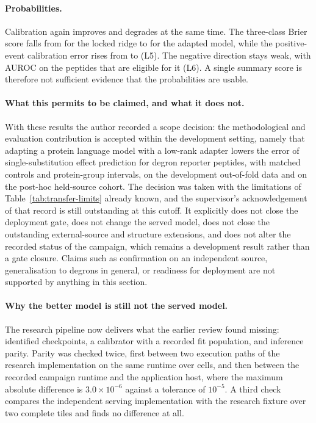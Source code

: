 \paragraph{Probabilities.}
Calibration again improves and degrades at the same time. The three-class Brier score falls from
\nTWfiveBrier{} for the locked ridge to \nTLoraBrier{} for the adapted model, while the
positive-event calibration error rises from \nTWfiveEce{} to \nTLoraEce{} (L5). The negative
direction stays weak, with AUROC \nTLoraAucMinus{} on the \nTMinusEligible{} peptides that are
eligible for it (L6). A single summary score is therefore not sufficient evidence that the
probabilities are usable.

\paragraph{What this permits to be claimed, and what it does not.}
With these results the author recorded a scope decision: the methodological and evaluation
contribution is accepted within the development setting, namely that adapting a protein language
model with a low-rank adapter lowers the error of single-substitution effect prediction for degron
reporter peptides, with matched controls and protein-group intervals, on the development
out-of-fold data and on the post-hoc held-source cohort. The decision was taken with the
limitations of Table~\ref{tab:transfer-limits} already known, and the supervisor's acknowledgement
of that record is still outstanding at this cutoff. It explicitly does not close the deployment
gate, does not change the served model, does not close the outstanding external-source and
structure extensions, and does not alter the recorded status of the campaign, which remains a
development result rather than a gate closure. Claims such as confirmation on an independent
source, generalisation to degrons in general, or readiness for deployment are not supported by
anything in this section.



\paragraph{Why the better model is still not the served model.}
The research pipeline now delivers what the earlier review found missing: identified checkpoints, a
calibrator with a recorded fit population, and inference parity. Parity was checked twice, first
between two execution paths of the research implementation on the same runtime over \nTParityRows{}
cells, and then between the recorded campaign runtime and the application host, where the maximum
absolute difference is $3.0\times10^{-6}$ against a tolerance of $10^{-5}$. A third check compares
the independent serving implementation with the research fixture over two complete tiles and finds
no difference at all.


